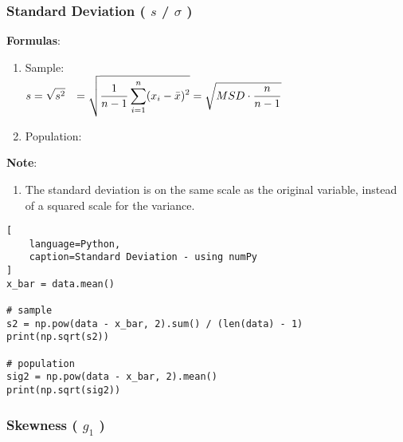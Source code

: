 \subsubsection{Standard Deviation ( $s$ / $\sigma$ ) \cite{statistics/book/Statistics-for-Data-Scientists/Maurits-Kaptein}} \label{Data/Describing Data/Central Tendency/Standard Deviation}

\textbf{Formulas}:
\begin{enumerate}
    \item Sample:
    \label{Data/Describing Data/Central Tendency/Standard Deviation/Sample} \\
        $
            \begin{aligned}
                s
                &=\sqrt{s^2} 
                &= \sqrt{\dfrac{1}{n-1} \displaystyle\sum_{i=1}^{n} (x_i - \bar{x})^2}
                &= \sqrt{MSD \cdot \dfrac{n}{n-1}}
            \end{aligned}
        $

    \item Population:
\end{enumerate}


\vspace{0.2cm}
\textbf{Note}:
\begin{enumerate}
    \item The standard deviation is on the same scale as the original variable, instead of a squared scale for the variance. \hfill \cite{statistics/book/Statistics-for-Data-Scientists/Maurits-Kaptein}

    
\end{enumerate}


\begin{lstlisting}[
    language=Python, 
    caption=Standard Deviation - using numPy
]
x_bar = data.mean()

# sample
s2 = np.pow(data - x_bar, 2).sum() / (len(data) - 1)
print(np.sqrt(s2))

# population
sig2 = np.pow(data - x_bar, 2).mean() 
print(np.sqrt(sig2))
\end{lstlisting}


\subsubsection{Skewness ( $g_1$ ) \cite{statistics/book/Statistics-for-Data-Scientists/Maurits-Kaptein}} \label{Data/Describing Data/Central Tendency/Skewness}

